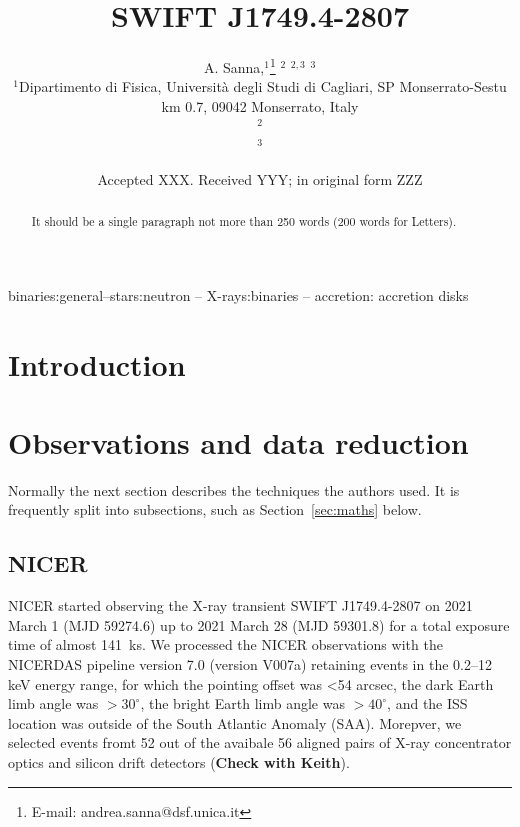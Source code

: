 \documentclass[fleqn,usenatbib]{mnras}
\title[Short title, max. 45 characters]{SWIFT J1749.4-2807}
\author[Sanna et al.]{
A. Sanna,$^{1}$\thanks{E-mail: andrea.sanna@dsf.unica.it}
$^{2}$
$^{2,3}$
$^{3}$
\\
$^{1}$Dipartimento di Fisica, Università degli Studi di Cagliari, SP Monserrato-Sestu km 0.7, 09042 Monserrato, Italy\\
$^{2}$\\
$^{3}$
}
\date{Accepted XXX. Received YYY; in original form ZZZ}
\newcommand{\swiftj}{SWIFT J1749.4-2807}
\begin{document}
\label{firstpage}
\pagerange{\pageref{firstpage}--\pageref{lastpage}}
\maketitle

\begin{abstract}
It should be a single paragraph not more than 250 words (200 words for Letters).
\end{abstract}

\begin{keywords}
binaries:general–stars:neutron – X-rays:binaries – accretion: accretion disks
\end{keywords}



\section{Introduction}


\section{Observations and data reduction}

Normally the next section describes the techniques the authors used.
It is frequently split into subsections, such as Section~\ref{sec:maths} below.

\subsection{NICER}

NICER \citep{Gendreau:2012vf} started observing the X-ray transient \swiftj{} on 2021 March 1 (MJD 59274.6) up to 2021 March 28 (MJD 59301.8) for a total exposure time of almost 141~ks. We processed the NICER observations with the NICERDAS pipeline version 7.0 (version V007a) retaining events in the 0.2–12 keV energy range, for which the pointing offset was <54 arcsec, the dark Earth limb angle was $>30^\circ$, the bright Earth limb angle was $>40^\circ$, and the ISS location was outside of the South Atlantic Anomaly (SAA). Morepver, we selected events fromt 52 out of the avaibale 56 aligned pairs of X-ray concentrator optics and silicon drift detectors (\textbf{Check with Keith}).
\end{document}
